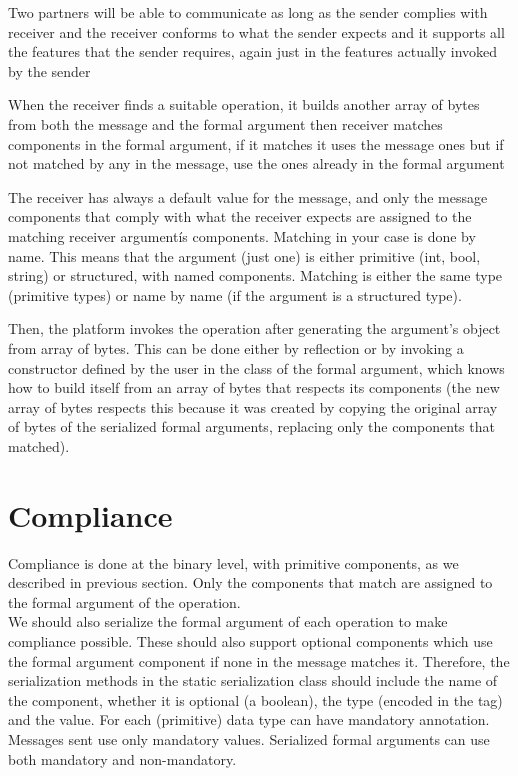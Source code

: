Two partners will be able to communicate as long as the sender complies with receiver and the receiver conforms to what the
sender expects and it supports all the features that the sender requires, again just in the features actually invoked by the
sender

When the receiver finds a suitable operation, it builds another array of bytes from both the message and the formal argument
then receiver matches components in the formal argument, if it matches it uses the message ones but if not matched by any in the message,
use the ones already in the formal argument

The receiver has always a default value for the message, and only the message components that comply with what the receiver
expects are assigned to the matching receiver argumentís components. Matching in your case is done by name. This means that
the argument (just one) is either primitive (int, bool, string) or structured, with named components. Matching is either the
same type (primitive types) or name by name (if the argument is a structured type).

Then, the platform invokes the operation after generating the argument’s object from array of bytes.
This can be done either by reflection or by invoking a constructor defined by the user in the class of the formal argument,
which knows how to build itself from an array of bytes that respects its components (the new array of bytes respects this
because it was created by copying the original array of bytes of the serialized formal arguments, replacing only the components
 that matched).




\section{Compliance}
\label{section:compliance}

Compliance is done at the binary level, with primitive components, as we described in previous section. Only the components
that match are assigned to the formal argument of the operation.\\

We should also serialize the formal argument of each operation to make compliance possible. These should also support
optional components which use the formal argument component if none in the message matches it. Therefore, the serialization
methods in the static serialization class should include the name of the component, whether it is optional (a boolean), the type
(encoded in the tag) and the value. For each (primitive) data type can have mandatory annotation.
Messages sent use only mandatory values. Serialized formal arguments can use both mandatory and non-mandatory.

